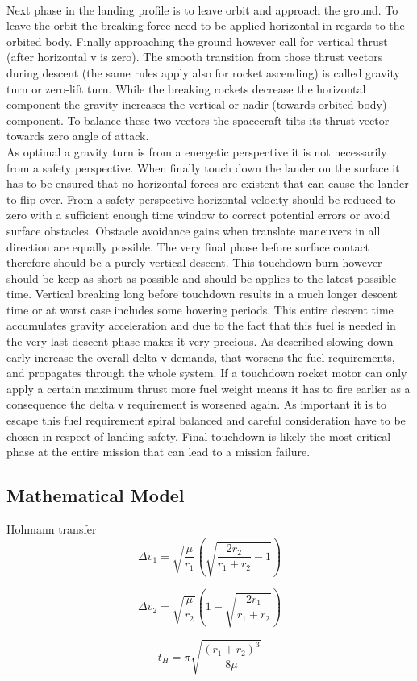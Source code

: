 \\
Next phase in the landing profile is to leave orbit and approach the ground. To leave the orbit the breaking force need to be applied horizontal in regards to the orbited body. Finally approaching the ground however call for vertical thrust (after horizontal v is zero). The smooth transition from those thrust vectors during descent (the same rules apply also for rocket ascending)  is called gravity turn or zero-lift turn. While the breaking rockets decrease the horizontal component the gravity increases the vertical or nadir (towards orbited body) component. To balance these two vectors the spacecraft tilts its thrust vector towards zero angle of attack.\\
As optimal a gravity turn is from a energetic perspective it is not necessarily from a safety perspective. When finally touch down the lander on the surface it has to be ensured that no horizontal forces are existent that can cause the lander to flip over. From a safety perspective horizontal velocity should be reduced to zero with a sufficient enough time window to correct potential errors or avoid surface obstacles. Obstacle avoidance gains when translate maneuvers in all direction are equally possible. The very final phase before surface contact therefore should be a purely vertical descent. This touchdown burn however should be keep as short as possible and should be applies to the latest possible time. Vertical breaking long before touchdown results in a much longer descent time or at worst case includes some hovering periods. This entire descent time accumulates gravity acceleration and due to the fact that this fuel is needed in the very last descent phase makes it very precious. As described slowing down early increase the overall delta v demands, that worsens the fuel requirements, and propagates through the whole system. If a touchdown rocket motor can only apply a certain maximum thrust more fuel weight means it has to fire earlier as a consequence the delta v requirement is worsened again. As important it is to escape this fuel requirement spiral balanced and careful consideration have to be chosen in respect of landing safety. Final touchdown is likely the most critical phase at the entire mission that can lead to a mission failure.\\

\subsection{Mathematical Model}
Hohmann transfer
$$ \Delta v_{1} = \sqrt{\frac{\mu}{r_{1}}}\left(\sqrt{\frac{2r_{2}}{r_{1}+r_{2}}-1}\right) $$

$$ \Delta v_{2} = \sqrt{\frac{\mu}{r_{2}}}\left(1-\sqrt{\frac{2r_{1}}{r_{1}+r_{2}}}\right) $$

$$ t_{H}= \pi \sqrt{\frac{(r_{1}+r_{2})^3}{8\mu}} $$